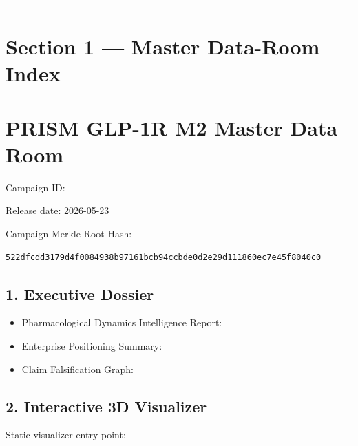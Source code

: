 \documentclass[11pt,a4paper]{article}
\providecommand{\tightlist}{\setlength{\itemsep}{0pt}\setlength{\parskip}{0pt}}
\begin{document}
\vspace{2mm}
\hrule
\vspace{4mm}

\hypertarget{section-1--master-data-room-index}{%
\section{Section 1 --- Master Data-Room Index}\label{section-1--master-data-room-index}}

\hypertarget{prism-glp-1r-m2-master-data-room}{%
\section{PRISM GLP-1R M2 Master Data Room}\label{prism-glp-1r-m2-master-data-room}}

Campaign ID: \texttt{}

Release date: 2026-05-23

Campaign Merkle Root Hash:

\begin{lstlisting}
522dfcdd3179d4f0084938b97161bcb94ccbde0d2e29d111860ec7e45f8040c0
\end{lstlisting}

\hypertarget{1-executive-dossier}{%
\subsection{1. Executive Dossier}\label{1-executive-dossier}}

\begin{itemize}
\tightlist
\item
  Pharmacological Dynamics Intelligence Report:
  \texttt{}
\item
  Enterprise Positioning Summary: \texttt{}
\item
  Claim Falsification Graph: \texttt{}
\end{itemize}

\hypertarget{2-interactive-3d-visualizer}{%
\subsection{2. Interactive 3D Visualizer}\label{2-interactive-3d-visualizer}}

Static visualizer entry point:
\texttt{}
\end{document}
